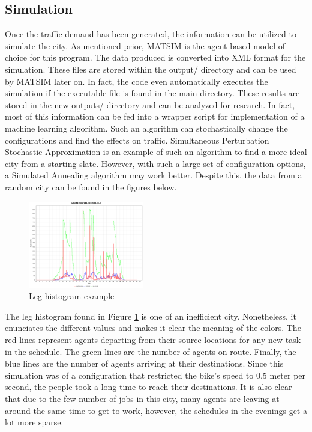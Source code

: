 \documentclass[11pt]{article}
\begin{document}
\begin{multicols}{2}
    \section{Simulation}

    \quad Once the traffic demand has been generated, the information can be utilized to simulate the city. As mentioned prior, MATSIM \cite{matsim} is the agent based model of choice for this program. The data produced is converted into XML format for the simulation. These files are stored within the output/ directory and can be used by MATSIM later on. In fact, the code even automatically executes the simulation if the executable file is found in the main directory. These results are stored in the new outputs/ directory and can be analyzed for research. In fact, most of this information can be fed into a wrapper script for implementation of a machine learning algorithm. Such an algorithm can stochastically change the configurations and find the effects on traffic. Simultaneous Perturbation Stochastic Approximation is an example of such an algorithm to find a more ideal city from a starting slate. However, with such a large set of configuration options, a Simulated Annealing algorithm may work better. Despite this, the data from a random city can be found in the figures below.

    \begin{figure}[H]
        \centering
        \includegraphics[width=0.45\textwidth]{images/legHistogram.png}
        \caption{Leg histogram example}
        \label{fig:leg-histogram}
    \end{figure}

    \quad The leg histogram found in Figure \ref{fig:leg-histogram} is one of an inefficient city. Nonetheless, it enunciates the different values and makes it clear the meaning of the colors. The red lines represent agents departing from their source locations for any new task in the schedule. The green lines are the number of agents on route. Finally, the blue lines are the number of agents arriving at their destinations. Since this simulation was of a configuration that restricted the bike's speed to 0.5 meter per second, the people took a long time to reach their destinations. It is also clear that due to the few number of jobs in this city, many agents are leaving at around the same time to get to work, however, the schedules in the evenings get a lot more sparse. \\


\end{multicols}
\end{document}
